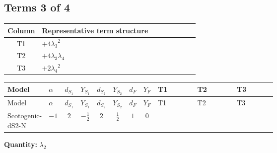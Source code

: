 \documentclass[8pt]{article}
\begin{document}
\begin{landscape}
\subsection*{Terms 3 of 4}
\begin{center}
\begin{tabular}{@{}c >{\raggedright\arraybackslash}p{0.82\linewidth}@{}}
\toprule
Column & Representative term structure \\
\midrule
T1 & \(\displaystyle +4 {\lambda_3}^2\) \\
\midrule
T2 & \(\displaystyle +4 {\lambda_3} {\lambda_4}\) \\
\midrule
T3 & \(\displaystyle +2 {\lambda_4}^2\) \\
\midrule
\bottomrule
\end{tabular}
\end{center}
\smallskip
\tiny
\begin{longtable}{@{}llcccccc >{\raggedright\arraybackslash}p{0.21\linewidth} >{\raggedright\arraybackslash}p{0.21\linewidth} >{\raggedright\arraybackslash}p{0.21\linewidth}@{}}
\toprule
Model & $\alpha$ & $d_{S_1}$ & $Y_{S_1}$ & $d_{S_2}$ & $Y_{S_2}$ & $d_F$ & $Y_F$ & T1 & T2 & T3 \\
\midrule
\endfirsthead
\toprule
Model & $\alpha$ & $d_{S_1}$ & $Y_{S_1}$ & $d_{S_2}$ & $Y_{S_2}$ & $d_F$ & $Y_F$ & T1 & T2 & T3 \\
\midrule
\endhead
Scotogenic-dS2-N & $-1$ & $2$ & $-\frac{1}{2}$ & $2$ & $\frac{1}{2}$ & $1$ & $0$ & \scriptsize\adjustbox{max width=\linewidth}{$\begin{gathered} +4 {\lambda_3}^2\end{gathered}$} & \scriptsize\adjustbox{max width=\linewidth}{$\begin{gathered} +4 {\lambda_3} {\lambda_4}\end{gathered}$} & \scriptsize\adjustbox{max width=\linewidth}{$\begin{gathered} +2 {\lambda_4}^2\end{gathered}$} \\
\midrule
\bottomrule
\end{longtable}
\clearpage
\noindent\textbf{Quantity: }$\lambda_2$\par\smallskip

\end{landscape}
\end{document}
